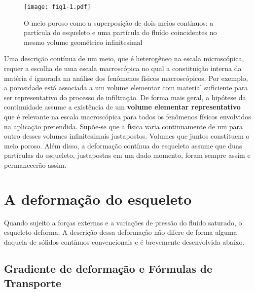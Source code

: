 \documentclass[
	11pt, %
	fleqn, %
	a4paper, %
]{LegrandOrangeBook}
\begin{document}
\begin{figure}[H] %
	\centering %
	\texttt{[image: fig1-1.pdf]} %
	\caption{O meio poroso como a superposição de dois meios contínuos: a partícula do esqueleto e uma partícula do fluído coincidentes no mesmo volume geométrico infinitesimal}
	\label{fig:fig1-1.pdf} %
\end{figure}

Uma descrição contínua de um meio, que é heterogêneo na escala microscópica, requer a escolha de uma escala macroscópica no qual a constituição interna da matéria é ignorada na análise dos fenômenos físicos macroscópicos. Por exemplo, a porosidade está associada a um volume elementar com material suficiente para ser representativo do processo de infiltração. De forma mais geral, a hipótese da continuidade assume a existência de um \textbf{volume elementar representativo} que é relevante na escala macroscópica para todos os fenômenos físicos envolvidos na aplicação pretendida. Supõe-se que a física varia continuamente de um para outro desses volumes infinitesimais justapostos. Volumes que juntos constituem o meio poroso. Além disso, a deformação contínua do esqueleto assume que duas partículas do esqueleto, justapostas em um dado momento, foram sempre assim e permanecerão assim. 

\section{A deformação do esqueleto}

Quando sujeito a forças externas e a variações de pressão do fluído saturado, o esqueleto deforma. A descrição dessa deformação não difere de forma alguma daquela de sólidos contínuos convencionais e é brevemente desenvolvida abaixo.



\subsection{Gradiente de deformação e Fórmulas de Transporte}


\newcommand{\Fll}{\textbf{F}}
\newcommand{\Ml}{\textbf{M}}
\newcommand{\Nl}{\textbf{N}}
\newcommand{\Cl}{\textbf{C}}
\newcommand{\nl}{\textbf{n}}
\newcommand{\dl}{\textbf{d}}
\newcommand{\Rll}{\textbf{R}}
\newcommand{\Tll}{\textbf{T}}
\newcommand{\Dll}{\textbf{D}}
\newcommand{\Ul}{\textbf{U}}
\newcommand{\Xl}{\textbf{X}}
\newcommand{\Yl}{\textbf{Y}}
\newcommand{\wl}{\textbf{w}}
\newcommand{\Xil}{\bm{\xi}}
\newcommand{\strainll}{\bm{\varepsilon}}
\newcommand{\Omegall}{\bm{\Omega}}
\newcommand{\omegal}{\bm{\omega}}
\newcommand{\gammal}{\bm{\gamma}}
\newcommand{\xl}{\textbf{x}}
\newcommand{\yl}{\textbf{y}}
\newcommand{\el}{\textbf{e}}
\newcommand{\onell}{\bm{1}}
\newcommand{\vl}{\textbf{v}}
\newcommand{\Vl}{\textbf{V}}
\newcommand{\Deltall}{\bm{\Delta}}
\end{document}
